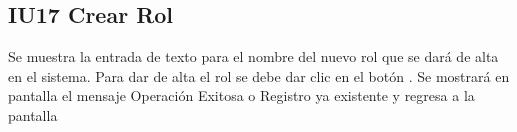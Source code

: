 \newpage
\subsection{IU17 Crear Rol}
	Se muestra la entrada de texto para el nombre del nuevo rol que se dará de alta en el sistema.  Para dar de alta el rol se debe dar clic en el botón  . Se mostrará en pantalla el mensaje Operación Exitosa o Registro ya existente y regresa a la pantalla 
